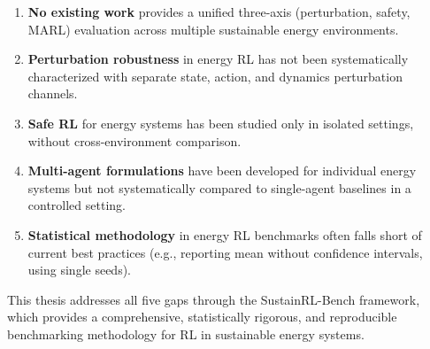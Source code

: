 \begin{enumerate}
    \item \textbf{No existing work} provides a unified three-axis (perturbation, safety, MARL) evaluation across multiple sustainable energy environments.
    \item \textbf{Perturbation robustness} in energy RL has not been systematically characterized with separate state, action, and dynamics perturbation channels.
    \item \textbf{Safe RL} for energy systems has been studied only in isolated settings, without cross-environment comparison.
    \item \textbf{Multi-agent formulations} have been developed for individual energy systems but not systematically compared to single-agent baselines in a controlled setting.
    \item \textbf{Statistical methodology} in energy RL benchmarks often falls short of current best practices (e.g., reporting mean without confidence intervals, using single seeds).
\end{enumerate}

This thesis addresses all five gaps through the SustainRL-Bench framework, which provides a comprehensive, statistically rigorous, and reproducible benchmarking methodology for RL in sustainable energy systems.
